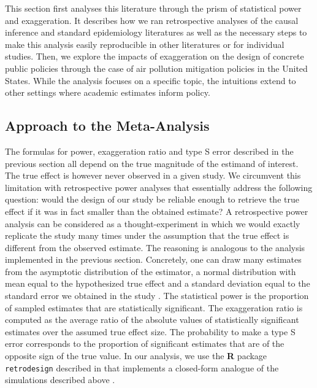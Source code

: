 \documentclass[12pt]{article}
\begin{document}
	This section first analyses this literature through the prism of statistical power and exaggeration. It describes how we ran retrospective analyses of the causal inference and standard epidemiology literatures as well as the necessary steps to make this analysis easily reproducible in other literatures or for individual studies. Then, we explore the impacts of exaggeration on the design of concrete public policies through the case of air pollution mitigation policies in the United States. While the analysis focuses on a specific topic, the intuitions extend to other settings where academic estimates inform policy. 
    
    \subsection{Approach to the Meta-Analysis}
    
        The formulas for power, exaggeration ratio and type S error described in the previous section all depend on the true magnitude of the estimand of interest. The true effect is however never observed in a given study. We circumvent this limitation with retrospective power analyses that essentially address the following question: would the design of our study be reliable enough to retrieve the true effect if it was in fact smaller than the obtained estimate? A retrospective power analysis can be considered as a thought-experiment in which we would exactly replicate the study many times under the assumption that the true effect is different from the observed estimate. The reasoning is analogous to the analysis implemented in the previous section. Concretely, one can draw many estimates from the asymptotic distribution of the estimator, a normal distribution with mean equal to the hypothesized true effect and a standard deviation equal to the standard error we obtained in the study \citep{gelman_beyond_2014}. The statistical power is the proportion of sampled estimates that are statistically significant. The exaggeration ratio is computed as the average ratio of the absolute values of statistically significant estimates over the assumed true effect size. The probability to make a type S error corresponds to the proportion of significant estimates that are of the opposite sign of the true value. In our analysis, we use the \textbf{\textsf{R}} package \texttt{retrodesign} described in \cite{timm_retrodesign_2019} that implements a closed-form analogue of the simulations described above \citep{lu_note_2019}.
    
\end{document}
